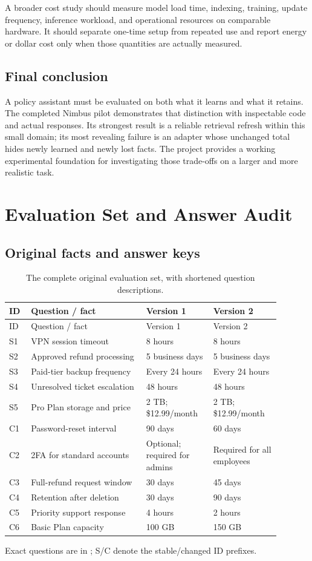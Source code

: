 \documentclass[11pt,letterpaper,oneside]{report}
\begin{document}
A broader cost study should measure model load time, indexing, training, update frequency, inference workload, and operational resources on comparable hardware. It should separate one-time setup from repeated use and report energy or dollar cost only when those quantities are actually measured.

\section{Final conclusion}
A policy assistant must be evaluated on both what it learns and what it retains. The completed Nimbus pilot demonstrates that distinction with inspectable code and actual responses. Its strongest result is a reliable retrieval refresh within this small domain; its most revealing failure is an adapter whose unchanged total hides newly learned and newly lost facts. The project provides a working experimental foundation for investigating those trade-offs on a larger and more realistic task.

\appendix
\chapter{Evaluation Set and Answer Audit}
\section{Original facts and answer keys}
\begin{longtable}{P{0.07\linewidth}P{0.38\linewidth}P{0.22\linewidth}P{0.22\linewidth}}
\caption{The complete original evaluation set, with shortened question descriptions.}\\
\toprule ID & Question / fact & Version 1 & Version 2\\\midrule\endfirsthead
\toprule ID & Question / fact & Version 1 & Version 2\\\midrule\endhead
S1 & VPN session timeout & 8 hours & 8 hours\\
S2 & Approved refund processing & 5 business days & 5 business days\\
S3 & Paid-tier backup frequency & Every 24 hours & Every 24 hours\\
S4 & Unresolved ticket escalation & 48 hours & 48 hours\\
S5 & Pro Plan storage and price & 2 TB; \$12.99/month & 2 TB; \$12.99/month\\
C1 & Password-reset interval & 90 days & 60 days\\
C2 & 2FA for standard accounts & Optional; required for admins & Required for all employees\\
C3 & Full-refund request window & 30 days & 45 days\\
C4 & Retention after deletion & 30 days & 90 days\\
C5 & Priority support response & 4 hours & 2 hours\\
C6 & Basic Plan capacity & 100 GB & 150 GB\\\bottomrule
\end{longtable}
Exact questions are in ; S/C denote the stable/changed ID prefixes.
\end{document}

